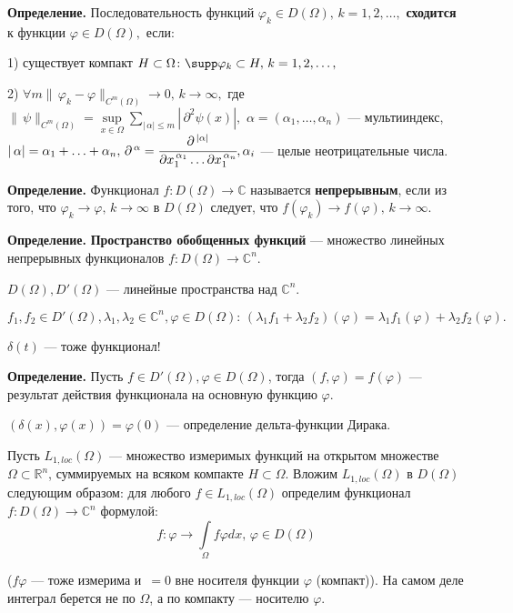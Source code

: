 \documentclass[unicode,12pt,draft]{article}
\begin{document}
\textbf{Определение.} Последовательность функций $\varphi_k\in
D(\Omega),\,k=1,2,\ldots,$ \textbf{сходится} к функции $\varphi\in
D(\Omega),$ если:

1) существует компакт $H\subset\Omega\colon \supp \varphi_k\subset
H,\,k=1,2,\ldots,$

2) $\forall m
\|\,\varphi_k-\varphi\|_{C^m(\Omega)}\to0,\,k\to{\infty},$ где
$\|\,\psi\|_{C^m(\Omega)}=\sup\limits_{x\in\Omega}
\sum\limits_{|\,\alpha|\le m} |\,\partial^2\psi(x)|,$
$\alpha=(\alpha_1,\ldots,\alpha_n)$ --- мультииндекс,
$|\,\alpha|=\alpha_1+\ldots+\alpha_n, \,\partial^{\,\alpha}=\cfrac
{\partial^{\,|\alpha|}}{\partial x_1^{\,\alpha_1}\ldots \partial
x_1^{\,\alpha_n}}, \alpha_i$ --- целые неотрицательные числа.

\textbf{Определение.} Функционал $f\colon D(\Omega)\to\mathbb C$
называется \textbf{непрерывным}, если из того, что
$\varphi_k\to\varphi,\,k\to{\infty}$ в $D(\Omega)$ следует, что
$f(\varphi_k)\to f(\varphi),\,k\to{\infty}.$

\textbf{Определение.} \textbf{Пространство обобщенных функций} ---
множество линейных непрерывных функционалов $f\colon
D(\Omega)\to\mathbb C^n.$

$D(\Omega), D'(\Omega)$ --- линейные пространства над $\mathbb
C^n$.

$f_1,f_2\in D'(\Omega), \lambda_1,\lambda_2\in \mathbb C^n,
\varphi\in D(\Omega)\colon\,
(\lambda_1f_1+\lambda_2f_2)(\varphi)=\lambda_1f_1(\varphi)+\lambda_2f_2(\varphi).$

$\delta(t)$ --- тоже функционал!

\textbf{Определение.} Пусть $f\in D'(\Omega), \varphi\in
D(\Omega)$, тогда $(f,\varphi)=f(\varphi)$ --- результат действия
функционала на основную функцию $\varphi$.

$(\delta(x),\varphi(x))=\varphi(0)$ --- определение дельта-функции
Дирака.

Пусть $L_{1,loc}(\Omega)$ --- множество измеримых функций на
открытом множестве $\Omega\subset\mathbb R^n$, суммируемых на
всяком компакте $H\subset\Omega$. Вложим $L_{1,loc}(\Omega)$ в
$D(\Omega)$ следующим образом: для любого $f\in L_{1,loc}(\Omega)$
определим функционал $f\colon D(\Omega)\to\mathbb C^n$ формулой:
$$f\colon\varphi\to\int\limits_{\Omega}f\varphi dx, \, \varphi\in D(\Omega)$$

($f\varphi$ --- тоже измерима и $\,=0$ вне носителя функции
$\varphi$ (компакт)). На самом деле интеграл берется  не по
$\Omega$, а по компакту --- носителю $\varphi$.
\end{document}
